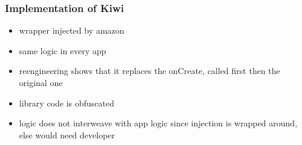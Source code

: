 \subsubsection{Implementation of Kiwi} \label{section:license-amazon-implementation}
\begin{itemize}
    \item wrapper injected by amazon
    \item same logic in every app
    \item reengineering shows that it replaces the onCreate, called first then the original one
    \item library code is obfuscated
    \item logic does not interweave with app logic since injection is wrapped around, else would need developer
\end{itemize}

